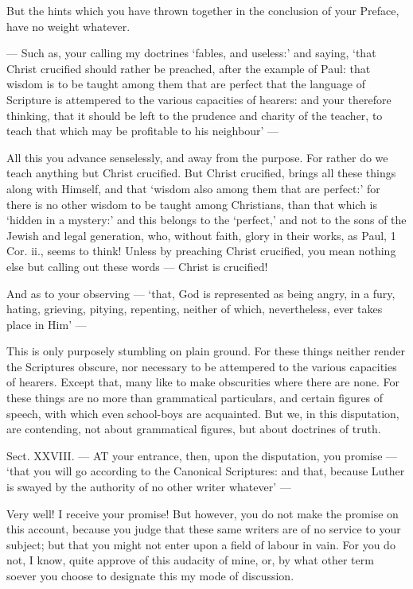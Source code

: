 But the hints which you have thrown together in the conclusion of your Preface, have no weight whatever.

— Such as, your calling my doctrines ‘fables, and useless:’ and saying, ‘that Christ crucified should rather be preached, after the example of Paul: that wisdom is to be taught among them that are perfect that the language of Scripture is attempered to the various capacities of hearers: and your therefore thinking, that it should be left to the prudence and charity of the teacher, to teach that which may be profitable to his neighbour’ —

All this you advance senselessly, and away from the purpose. For rather do we teach anything but Christ crucified. But Christ crucified, brings all these things along with Himself, and that ‘wisdom also among them that are perfect:’ for there is no other wisdom to be taught among Christians, than that which is ‘hidden in a mystery:’ and this belongs to the ‘perfect,’ and not to the sons of the Jewish and legal generation, who, without faith, glory in their works, as Paul, 1 Cor. ii., seems to think! Unless by preaching Christ crucified, you mean nothing else but calling out these words — Christ is crucified!

And as to your observing — ‘that, God is represented as being angry, in a fury, hating, grieving, pitying, repenting, neither of which, nevertheless, ever takes place in Him’ —

This is only purposely stumbling on plain ground. For these things neither render the Scriptures obscure, nor necessary to be attempered to the various capacities of hearers. Except that, many like to make obscurities where there are none. For these things are no more than grammatical particulars, and certain figures of speech, with which even school-boys are acquainted. But we, in this disputation, are contending, not about grammatical figures, but about doctrines of truth.



Sect. XXVIII. — AT your entrance, then, upon the disputation, you promise — ‘that you will go according to the Canonical Scriptures: and that, because Luther is swayed by the authority of no other writer whatever’ —

Very well! I receive your promise! But however, you do not make the promise on this account, because you judge that these same writers are of no service to your subject; but that you might not enter upon a field of labour in vain. For you do not, I know, quite approve of this audacity of mine, or, by what other term soever you choose to designate this my mode of discussion.

